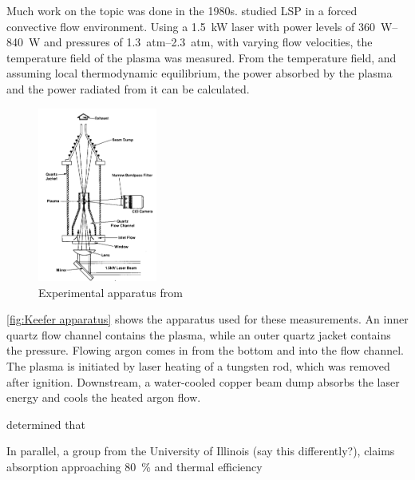         Much work on the topic was done in the 1980s. \textcite{keeferPowerAbsorptionLasersustained1986a} studied LSP in a forced convective flow environment. Using a \qty{1.5}{kW}  laser with power levels of \qtyrange{360}{840}{W} and pressures of \qtyrange{1.3}{2.3}{atm}, with varying flow velocities, the temperature field of the plasma was measured. From the temperature field, and assuming local thermodynamic equilibrium, the power absorbed by the plasma and the power radiated from it can be calculated.

        \begin{figure}[h]
            \centering
            \includegraphics[width=0.35\textwidth]{assets/2 background/UTSI (Keefer) Apparatus.png}
            \caption{Experimental apparatus from \textcite{keeferPowerAbsorptionLasersustained1986a}}
            \label{fig:Keefer apparatus}
        \end{figure}
        
        \autoref{fig:Keefer apparatus} shows the apparatus used for these measurements. An inner quartz flow channel contains the plasma, while an outer quartz jacket contains the pressure. Flowing argon comes in from the bottom and into the flow channel. The plasma is initiated by laser heating of a tungsten rod, which was removed after ignition. Downstream, a water-cooled copper beam dump absorbs the laser energy and cools the heated argon flow.

         determined that %

        In parallel, a group from the University of Illinois (say this differently?), claims absorption approaching \qty{80}{\%} and thermal efficiency

